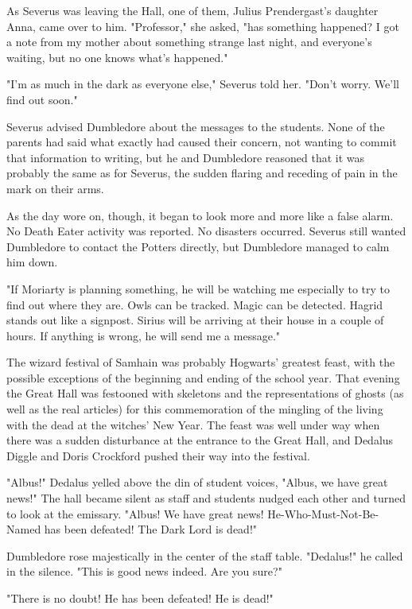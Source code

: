 As Severus was leaving the Hall, one of them, Julius Prendergast's daughter Anna, came over to him. "Professor," she asked, "has something happened? I got a note from my mother about something strange last night, and everyone's waiting, but no one knows what's happened."

"I'm as much in the dark as everyone else," Severus told her. "Don't worry. We'll find out soon."

Severus advised Dumbledore about the messages to the students. None of the parents had said what exactly had caused their concern, not wanting to commit that information to writing, but he and Dumbledore reasoned that it was probably the same as for Severus, the sudden flaring and receding of pain in the mark on their arms.

As the day wore on, though, it began to look more and more like a false alarm. No Death Eater activity was reported. No disasters occurred. Severus still wanted Dumbledore to contact the Potters directly, but Dumbledore managed to calm him down.

"If Moriarty is planning something, he will be watching me especially to try to find out where they are. Owls can be tracked. Magic can be detected. Hagrid stands out like a signpost. Sirius will be arriving at their house in a couple of hours. If anything is wrong, he will send me a message."

The wizard festival of Samhain was probably Hogwarts' greatest feast, with the possible exceptions of the beginning and ending of the school year. That evening the Great Hall was festooned with skeletons and the representations of ghosts (as well as the real articles) for this commemoration of the mingling of the living with the dead at the witches' New Year. The feast was well under way when there was a sudden disturbance at the entrance to the Great Hall, and Dedalus Diggle and Doris Crockford pushed their way into the festival.

"Albus!" Dedalus yelled above the din of student voices, "Albus, we have great news!" The hall became silent as staff and students nudged each other and turned to look at the emissary. "Albus! We have great news! He-Who-Must-Not-Be-Named has been defeated! The Dark Lord is dead!"

Dumbledore rose majestically in the center of the staff table. "Dedalus!" he called in the silence. "This is good news indeed. Are you sure?"

"There is no doubt! He has been defeated! He is dead!"

